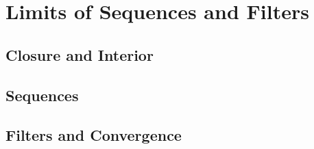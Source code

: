 \chapter{Limits of Sequences and Filters}

\section{Closure and Interior}



\section{Sequences}










\section{Filters and Convergence}













